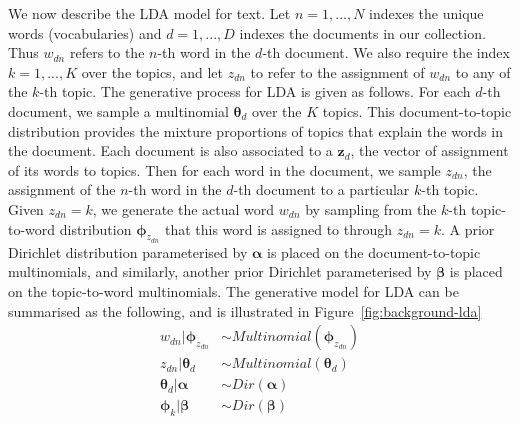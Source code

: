 We now describe the LDA model for text. Let $n=1,...,N$ indexes the unique words (vocabularies) and $d=1,...,D$ indexes the documents in our collection. Thus $w_{dn}$ refers to the $n$-th word in the $d$-th document. We also require the index $k=1,...,K$ over the topics, and let $z_{dn}$ to refer to the assignment of $w_{dn}$ to any of the $k$-th topic. The generative process for LDA is given as follows. For each $d$-th document, we sample a multinomial $\boldsymbol{\theta}_{d}$ over the $K$ topics. This document-to-topic distribution provides the mixture proportions of topics that explain the words in the document. Each document is also associated to a $\boldsymbol{z}_d$, the vector of assignment of its words to topics. Then for each word in the document, we sample $z_{dn}$, the assignment of the $n$-th word in the $d$-th document to a particular $k$-th topic. Given $z_{dn}=k$, we generate the actual word $w_{dn}$ by sampling from the $k$-th topic-to-word distribution $\boldsymbol{\phi}_{z_{dn}}$ that this word is assigned to through $z_{dn}=k$. A prior Dirichlet distribution parameterised by $\boldsymbol{\alpha}$ is placed on the document-to-topic multinomials, and similarly, another prior Dirichlet parameterised by $\boldsymbol{\beta}$ is placed on the topic-to-word multinomials. The generative model for LDA can be summarised as the following, and is illustrated in Figure~\ref{fig:background-lda}
\begin{equation}
\begin{aligned}
w_{dn} \vert \boldsymbol{\phi}_{z_{dn}} &\sim Multinomial(\boldsymbol{\phi}_{z_{dn}}) \\
z_{dn} \vert \boldsymbol{\theta}_{d}      &\sim Multinomial(\boldsymbol{\theta}_{d}) \\
\boldsymbol{\theta}_{d} \vert \boldsymbol{\alpha}                &\sim Dir(\boldsymbol{\alpha}) \\ 
\boldsymbol{\phi}_{k} \vert \boldsymbol{\beta}                     &\sim Dir(\boldsymbol{\beta})
\end{aligned}
\label{eq:background-lda-model}
\end{equation}

